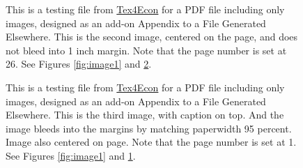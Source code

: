 \documentclass{article}
\begin{document}
\begin{figure}[p]
\hspace*{-\dimexpr\oddsidemargin+1in\relax}
\caption{This is a testing file from \href{https://fanwangecon.github.io/Tex4Econ/}{Tex4Econ} for a PDF file including only images, designed as an add-on Appendix to a File Generated Elsewhere. This is the second image, centered on the page, and does not bleed into 1 inch margin. Note that the page number is set at 26. See Figures \ref{fig:image1} and \ref{fig:image3}. \label{fig:image2}}
\hspace*{-\paperwidth}
\end{figure}

\pagebreak
\clearpage


\setcounter{page}{1}


\begin{figure}[p]
\caption{This is a testing file from \href{https://fanwangecon.github.io/Tex4Econ/}{Tex4Econ} for a PDF file including only images, designed as an add-on Appendix to a File Generated Elsewhere. This is the third image, with caption on top. And the image bleeds into the margins by matching paperwidth 95 percent. Image also centered on page. Note that the page number is set at 1. See Figures \ref{fig:image1} and \ref{fig:image2}. \label{fig:image3}}
\hspace*{-\dimexpr\oddsidemargin+1in\relax}
\hspace*{-\paperwidth}
\end{figure}
\end{document}
